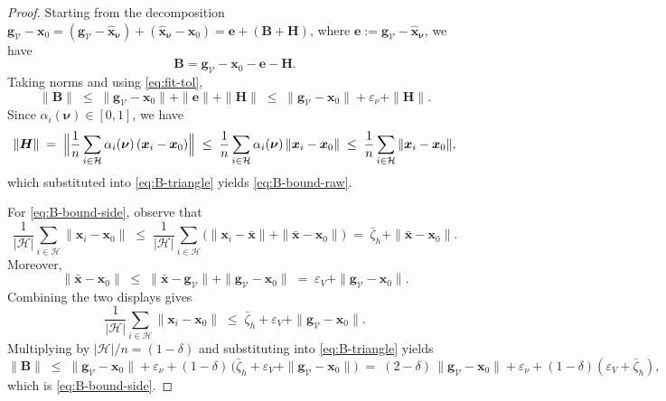 \documentclass{article}
\theoremstyle{plain}
\theoremstyle{definition}
\theoremstyle{remark}
\begin{document}
\begin{proof}
Starting from the decomposition $\bm{g}_{\mathcal{V}}-\bm{x}_0
= (\bm{g}_{\mathcal{V}}-\hat{\bm{x}}_{\bm{\nu}}) + (\hat{\bm{x}}_{\bm{\nu}}-\bm{x}_0)
= \bm{e} + (\bm{B}+\bm{H})$, where $\bm{e}:=\bm{g}_{\mathcal{V}}-\hat{\bm{x}}_{\bm{\nu}}$,
we have
\begin{equation}
\bm{B}
= \bm{g}_{\mathcal{V}}-\bm{x}_0 - \bm{e} - \bm{H}.
\label{eq:B-identity}
\end{equation}
Taking norms and using \eqref{eq:fit-tol},
\begin{equation}
\|\bm{B}\|
\;\le\;
\bigl\|\bm{g}_{\mathcal{V}}-\bm{x}_0\bigr\|
+ \|\bm{e}\|
+ \|\bm{H}\|
\;\le\;
\bigl\|\bm{g}_{\mathcal{V}}-\bm{x}_0\bigr\|
+ \varepsilon_\nu
+ \|\bm{H}\|.
\label{eq:B-triangle}
\end{equation}
Since $\alpha_i(\bm{\nu})\in[0,1]$, we have
\[
\|\bm{H}\|
\;=\;
\Bigl\|\frac{1}{n}\sum_{i\in\mathcal{H}} \alpha_i(\bm{\nu})\,(\bm{x}_i-\bm{x}_0)\Bigr\|
\;\le\;
\frac{1}{n}\sum_{i\in\mathcal{H}} \alpha_i(\bm{\nu})\,\|\bm{x}_i-\bm{x}_0\|
\;\le\;
\frac{1}{n}\sum_{i\in\mathcal{H}}\|\bm{x}_i-\bm{x}_0\|,
\]
which substituted into \eqref{eq:B-triangle} yields \eqref{eq:B-bound-raw}.

For \eqref{eq:B-bound-side}, observe that
\[
\frac{1}{|\mathcal{H}|}\sum_{i\in\mathcal{H}}\|\bm{x}_i-\bm{x}_0\|
\;\le\;
\frac{1}{|\mathcal{H}|}\sum_{i\in\mathcal{H}}
\bigl(\|\bm{x}_i-\bar{\bm{x}}\| + \|\bar{\bm{x}}-\bm{x}_0\|\bigr)
\;=\;
\bar{\zeta}_h + \|\bar{\bm{x}}-\bm{x}_0\|.
\]
Moreover,
\[
\|\bar{\bm{x}}-\bm{x}_0\|
\;\le\;
\|\bar{\bm{x}}-\bm{g}_{\mathcal{V}}\| + \|\bm{g}_{\mathcal{V}}-\bm{x}_0\|
\;=\;
\varepsilon_V + \|\bm{g}_{\mathcal{V}}-\bm{x}_0\|.
\]
Combining the two displays gives
\[
\frac{1}{|\mathcal{H}|}\sum_{i\in\mathcal{H}}\|\bm{x}_i-\bm{x}_0\|
\;\le\;
\bar{\zeta}_h + \varepsilon_V + \|\bm{g}_{\mathcal{V}}-\bm{x}_0\|.
\]
Multiplying by $|\mathcal{H}|/n=(1-\delta)$ and substituting into
\eqref{eq:B-triangle} yields
\[
\|\bm{B}\|
\;\le\;
\|\bm{g}_{\mathcal{V}}-\bm{x}_0\| + \varepsilon_\nu
+ (1-\delta)\,\bigl(\bar{\zeta}_h + \varepsilon_V + \|\bm{g}_{\mathcal{V}}-\bm{x}_0\|\bigr)
\;=\;
(2-\delta)\,\|\bm{g}_{\mathcal{V}}-\bm{x}_0\|
+ \varepsilon_\nu + (1-\delta)(\varepsilon_V+\bar{\zeta}_h),
\]
which is \eqref{eq:B-bound-side}.
\end{proof}
\end{document}
